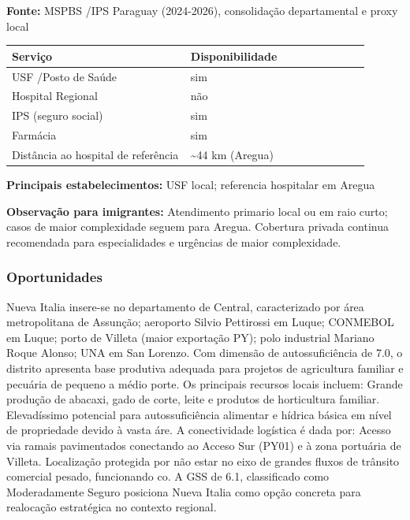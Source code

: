 \textbf{Fonte:} MSPBS /\allowbreak  IPS Paraguay (2024-2026), consolidação
departamental e proxy local

{\def\LTcaptype{none} %
\begin{longtable}{@{}>{\raggedright\arraybackslash}p{0.45\linewidth} >{\raggedright\arraybackslash}p{0.45\linewidth}@{}}
\toprule\noalign{}
Serviço & Disponibilidade \\
\midrule\noalign{}
\endhead
\bottomrule\noalign{}
\endlastfoot
USF /\allowbreak  Posto de Saúde & sim \\
Hospital Regional & não \\
IPS (seguro social) & sim \\
Farmácia & sim \\
Distância ao hospital de referência & \textasciitilde44 km (Aregua) \\
\end{longtable}
}

\textbf{Principais estabelecimentos:} USF local; referencia hospitalar
em Aregua

\textbf{Observação para imigrantes:} Atendimento primario local ou em
raio curto; casos de maior complexidade seguem para Aregua. Cobertura
privada continua recomendada para especialidades e urgências de maior
complexidade.
\newpage

\subsubsection*{Oportunidades}\label{oport-nueva-italia-1111}
Nueva Italia insere-se no departamento de Central, caracterizado por área metropolitana de Assunção; aeroporto Silvio Pettirossi em Luque; CONMEBOL em Luque; porto de Villeta (maior exportação PY); polo industrial Mariano Roque Alonso; UNA em San Lorenzo. Com dimensão de autossuficiência de 7.0, o distrito apresenta base produtiva adequada para projetos de agricultura familiar e pecuária de pequeno a médio porte. Os principais recursos locais incluem: Grande produção de abacaxi, gado de corte, leite e produtos de horticultura familiar. Elevadíssimo potencial para autossuficiência alimentar e hídrica básica em nível de propriedade devido à vasta áre. A conectividade logística é dada por: Acesso via ramais pavimentados conectando ao Acceso Sur (PY01) e à zona portuária de Villeta. Localização protegida por não estar no eixo de grandes fluxos de trânsito comercial pesado, funcionando co. A GSS de 6.1, classificado como Moderadamente Seguro posiciona Nueva Italia como opção concreta para realocação estratégica no contexto regional.

